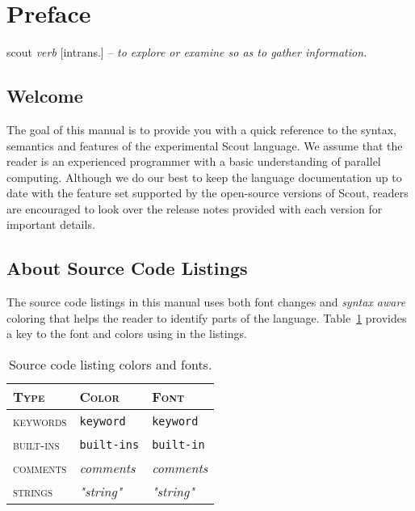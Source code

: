 \chapter*{Preface}

\textsf{scout \textsl{verb} [intrans.] -- \textit{to explore or examine so as to gather
information.}}
\vskip 0.25in

\section*{Welcome}
The goal of this manual is to provide you with a quick reference to the syntax, 
semantics and features of the experimental Scout language.  We assume that the
reader is an experienced programmer with a basic understanding of parallel 
computing.  Although we do our best to keep the language documentation up to 
date with the feature set supported by the open-source versions of Scout, readers
are encouraged to look over the release notes provided with each version for 
important details.

\section*{About Source Code Listings}

The source code listings in this manual uses both font changes and \textit{syntax aware} 
coloring that helps the reader to identify parts of the language.  Table~\ref{src_listing_table}
provides a key to the font and colors using in the listings. 

\begin{table}
  \begin{center}
  \begin{tabular}{| l | l | l |}
    \hline
 	\textsc{Type}      & \textsc{Color}                           & \textsc{Font}     \\ \hline 
	\textsc{keywords}  & {\texttt{\color{keywordcolor}keyword}}   & \texttt{keyword}  \\ \hline 
    \textsc{built-ins} & {\texttt{\color{builtincolor}built-ins}} & \texttt{built-in} \\ \hline 
    \textsc{comments}  & {\textit{\color{commentcolor}comments}}  & \textit{comments} \\ \hline 
    \textsc{strings}   & {\textit{\color{stringcolor}"string"}}   & \textit{"string"} \\ \hline 
  \end{tabular}
  \end{center}
  \caption{Source code listing colors and fonts.}
  \label{src_listing_table} 
\end{table}


